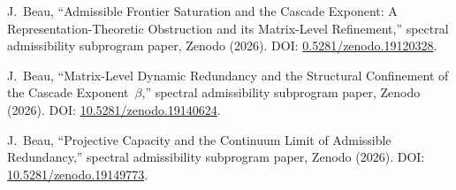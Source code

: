 J.~Beau,
``Admissible Frontier Saturation and the Cascade Exponent: A Representation-Theoretic Obstruction and its Matrix-Level
Refinement,''
spectral admissibility subprogram paper, Zenodo (2026).
DOI: \href{https://doi.org/10.5281/zenodo.19120328}{0.5281/zenodo.19120328}.

J.~Beau,
``Matrix-Level Dynamic Redundancy and the Structural Confinement of the Cascade Exponent~$\beta$,''
spectral admissibility subprogram paper, Zenodo (2026).
DOI: \href{https://doi.org/10.5281/zenodo.19140624}{10.5281/zenodo.19140624}.

J.~Beau,
``Projective Capacity and the Continuum Limit of Admissible Redundancy,''
spectral admissibility subprogram paper, Zenodo (2026).
DOI: \href{https://doi.org/10.5281/zenodo.19149773}{10.5281/zenodo.19149773}.
